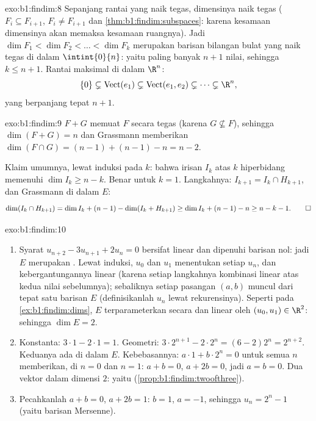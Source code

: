 \begin{solution}{exo:b1:findim:8}
Sepanjang rantai yang naik tegas, dimensinya naik tegas
($F_i \subseteq F_{i+1}$, $F_i \neq F_{i+1}$ dan
\cref{thm:b1:findim:subspaces}: karena kesamaan dimensinya akan memaksa
kesamaan ruangnya). Jadi $\dim F_1 < \dim F_2 < \dots < \dim F_k$ merupakan
barisan bilangan bulat yang naik tegas di dalam $\intint{0}{n}$: yaitu paling
banyak $n + 1$ nilai, sehingga $k \leq n + 1$. Rantai maksimal di dalam $\R^n$:
\[
\{0\} \subsetneq \operatorname{Vect}(e_1) \subsetneq
\operatorname{Vect}(e_1, e_2) \subsetneq \dots \subsetneq \R^n ,
\]
yang berpanjang tepat $n + 1$.
\end{solution}

\begin{solution}{exo:b1:findim:9}
$F + G$ memuat $F$ secara tegas (karena $G \not\subseteq F$), sehingga
$\dim(F + G) = n$ dan Grassmann memberikan $\dim(F \cap G) = (n-1) +
(n-1) - n = n - 2$.

Klaim umumnya, lewat induksi pada $k$: bahwa irisan $I_k$ atas $k$
hiperbidang memenuhi $\dim I_k \geq n - k$. Benar untuk $k = 1$. Langkahnya: $I_{k+1}
= I_k \cap H_{k+1}$, dan Grassmann di dalam $E$:
\[
\dim(I_k \cap H_{k+1}) = \dim I_k + (n - 1) - \dim(I_k + H_{k+1})
\geq \dim I_k + (n-1) - n \geq n - k - 1 . \qedhere
\]
\end{solution}

\begin{solution}{exo:b1:findim:10}
\begin{enumerate}
  \item Syarat $u_{n+2} - 3u_{n+1} + 2u_n = 0$ bersifat linear
        dan dipenuhi barisan nol: jadi $E$ merupakan . Lewat
        induksi, $u_0$ dan $u_1$ menentukan setiap $u_n$, dan
        kebergantungannya linear (karena setiap langkahnya kombinasi linear atas
        kedua nilai sebelumnya); sebaliknya setiap pasangan $(a, b)$
        muncul dari tepat satu barisan $E$ (definisikanlah $u_n$ lewat
        rekurensinya). Seperti pada \cref{ex:b1:findim:dims}, $E$
        terparameterkan secara  dan linear oleh $(u_0, u_1) \in
        \R^2$: sehingga $\dim E = 2$.
  \item Konstanta: $3\cdot1 - 2\cdot1 = 1$. Geometri: $3\cdot
        2^{n+1} - 2\cdot 2^n = (6 - 2)2^n = 2^{n+2}$. Keduanya ada di dalam
        $E$. Kebebasannya: $a\cdot 1 + b\cdot 2^n = 0$ untuk semua $n$
        memberikan, di $n = 0$ dan $n = 1$: $a + b = 0$, $a + 2b = 0$,
        jadi $a = b = 0$. Dua vektor  dalam dimensi $2$: yaitu 
        (\cref{prop:b1:findim:twoofthree}).
  \item Pecahkanlah $a + b = 0$, $a + 2b = 1$: $b = 1$, $a = -1$, sehingga
        $u_n = 2^n - 1$ (yaitu barisan Mersenne).
\end{enumerate}
\end{solution}

